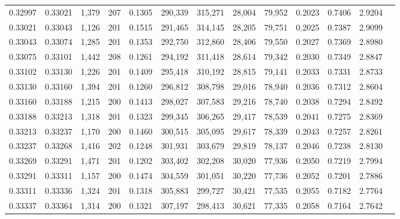 \begin{tabular}{rrrrrrrrrrrrr}
0.32997 & 0.33021 & 1,379 & 207 &                                     0.1305 & 290,339 & 315,271 &  28,004 &  79,952 & 0.2023 & 0.7406 & 2.9204 \\
0.33021 & 0.33043 & 1,126 & 201 &                                     0.1515 & 291,465 & 314,145 &  28,205 &  79,751 & 0.2025 & 0.7387 & 2.9099 \\
0.33043 & 0.33074 & 1,285 & 201 &                                     0.1353 & 292,750 & 312,860 &  28,406 &  79,550 & 0.2027 & 0.7369 & 2.8980 \\
0.33075 & 0.33101 & 1,442 & 208 &                                     0.1261 & 294,192 & 311,418 &  28,614 &  79,342 & 0.2030 & 0.7349 & 2.8847 \\
0.33102 & 0.33130 & 1,226 & 201 &                                     0.1409 & 295,418 & 310,192 &  28,815 &  79,141 & 0.2033 & 0.7331 & 2.8733 \\
0.33130 & 0.33160 & 1,394 & 201 &                                     0.1260 & 296,812 & 308,798 &  29,016 &  78,940 & 0.2036 & 0.7312 & 2.8604 \\
0.33160 & 0.33188 & 1,215 & 200 &                                     0.1413 & 298,027 & 307,583 &  29,216 &  78,740 & 0.2038 & 0.7294 & 2.8492 \\
0.33188 & 0.33213 & 1,318 & 201 &                                     0.1323 & 299,345 & 306,265 &  29,417 &  78,539 & 0.2041 & 0.7275 & 2.8369 \\
0.33213 & 0.33237 & 1,170 & 200 &                                     0.1460 & 300,515 & 305,095 &  29,617 &  78,339 & 0.2043 & 0.7257 & 2.8261 \\
0.33237 & 0.33268 & 1,416 & 202 &                                     0.1248 & 301,931 & 303,679 &  29,819 &  78,137 & 0.2046 & 0.7238 & 2.8130 \\
0.33269 & 0.33291 & 1,471 & 201 &                                     0.1202 & 303,402 & 302,208 &  30,020 &  77,936 & 0.2050 & 0.7219 & 2.7994 \\
0.33291 & 0.33311 & 1,157 & 200 &                                     0.1474 & 304,559 & 301,051 &  30,220 &  77,736 & 0.2052 & 0.7201 & 2.7886 \\
0.33311 & 0.33336 & 1,324 & 201 &                                     0.1318 & 305,883 & 299,727 &  30,421 &  77,535 & 0.2055 & 0.7182 & 2.7764 \\
0.33337 & 0.33364 & 1,314 & 200 &                                     0.1321 & 307,197 & 298,413 &  30,621 &  77,335 & 0.2058 & 0.7164 & 2.7642 \\

\end{tabular}
